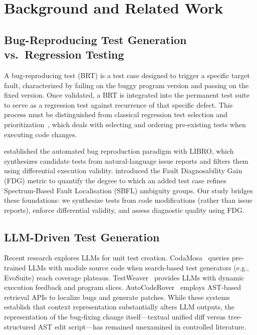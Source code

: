 \documentclass[12pt, a4paper]{article}
\begin{document}
\section{Background and Related Work}\label{sec:background}

\subsection{Bug-Reproducing Test Generation vs.\ Regression Testing}

A bug-reproducing test (BRT) is a test case designed to trigger a specific target fault, characterized by failing on the buggy program version and passing on the fixed version.
Once validated, a BRT is integrated into the permanent test suite to serve as a regression test against recurrence of that specific defect.
This process must be distinguished from classical regression test selection and prioritization~\citep{yoo2012regression}, which deals with selecting and ordering pre-existing tests when executing code changes.

\citet{kang2023libro} established the automated bug reproduction paradigm with LIBRO, which synthesizes candidate tests from natural-language issue reports and filters them using differential execution validity.
\citet{an2022fdg} introduced the Fault Diagnosability Gain (FDG) metric to quantify the degree to which an added test case refines Spectrum-Based Fault Localisation (SBFL) ambiguity groups.
Our study bridges these foundations: we synthesize tests from code modifications (rather than issue reports), enforce differential validity, and assess diagnostic quality using FDG.

\subsection{LLM-Driven Test Generation}

Recent research explores LLMs for unit test creation.
CodaMosa~\citep{lemieux2023codamosa} queries pre-trained LLMs with module source code when search-based test generators (e.g., EvoSuite) reach coverage plateaus.
TestWeaver~\citep{le2025testweaver} provides LLMs with dynamic execution feedback and program slices.
AutoCodeRover~\citep{zhang2024autocoderover} employs AST-based retrieval APIs to localize bugs and generate patches.
While these systems establish that context representation substantially alters LLM outputs, the representation of the bug-fixing change itself---textual unified diff versus tree-structured AST edit script---has remained unexamined in controlled literature.
\end{document}
